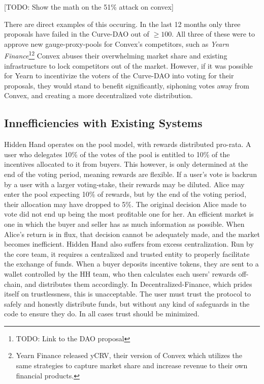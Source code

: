 \documentclass{article}
\begin{document}
[TODO: Show the math on the 51\% attack on convex]

There are direct examples of this occuring. In the last 12 months only three proposals have failed in the Curve-DAO out of $\ge 100$. All three of these were to approve new gauge-proxy-pools for Convex's competitors, such as \emph{Yearn Finance}\footnote{TODO: Link to the DAO proposal}\footnote{Yearn Finance released yCRV, their version of Convex which utilizes the same strategies to capture market share and increase revenue to their own financial products.} Convex abuses their overwhelming market share and existing infrastructure to lock competitors out of the market. However, if it was possible for Yearn to incentivize the voters of the Curve-DAO into voting for their proposals, they would stand to benefit significantly, siphoning votes away from Convex, and creating a more decentralized vote distribution. 

\subsection{Innefficiencies with Existing Systems}

Hidden Hand operates on the pool model, with rewards distributed pro-rata. A user who delegates 10\% of the votes of the pool is entitled to 10\% of the incentives allocated to it from buyers. This however, is only determined at the end of the voting period, meaning rewards are flexible. If a user's vote is backrun by a user with a larger voting-stake, their rewards may be diluted. Alice may enter the pool expecting 10\% of rewards, but by the end of the voting period, their allocation may have dropped to 5\%. The original decision Alice made to vote did not end up being the most profitable one for her. An efficient market is one in which the buyer and seller has as much information as possible. When Alice's return is in flux, that decision cannot be adequately made, and the market becomes inefficient. Hidden Hand also suffers from excess centralization. Run by the core team, it requires a centralized and trusted entity to properly facilitate the exchange of funds. When a buyer deposits incentive tokens, they are sent to a wallet controlled by the HH team, who then calculates each users' rewards off-chain, and distributes them accordingly. In Decentralized-Finance, which prides itself on trustlessness, this is unacceptable. The user must trust the protocol to safely and honestly distribute funds, but without any kind of safeguards in the code to ensure they do. In all cases trust should be minimized.
\end{document}
